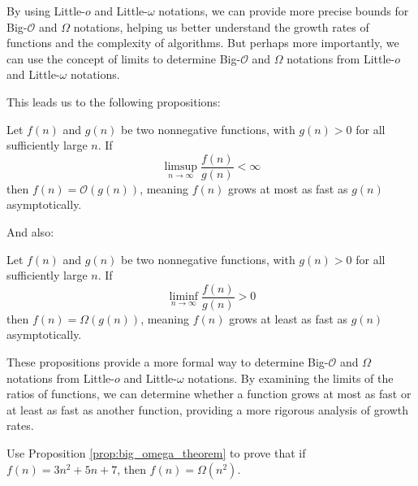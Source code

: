         By using Little-$o$ and Little-$\omega$ notations, we can provide more precise bounds for Big-$\mathcal{O}$ and $\Omega$ notations, helping us better understand the growth rates of functions and the complexity of algorithms. But perhaps more importantly, we can use the concept of limits to determine Big-$\mathcal{O}$ and $\Omega$ notations from Little-$o$ and Little-$\omega$ notations.

        This leads us to the following propositions:

        \begin{proposition} \label{prop:big_o_theorem}
            Let \( f(n) \) and \( g(n) \) be two nonnegative functions, with $g(n)>0$ for all sufficiently large $n$. If
            \medskip
            \[
            \limsup_{n \rightarrow \infty} \frac{f(n)}{g(n)} < \infty
            \]
            \medskip
            then \( f(n) = \mathcal{O}(g(n)) \), meaning \( f(n) \) grows at most as fast as \( g(n) \) asymptotically.
        \end{proposition}
        
        And also:


        \begin{proposition} \label{prop:big_omega_theorem}
            Let \( f(n) \) and \( g(n) \) be two nonnegative functions, with $g(n)>0$ for all sufficiently large $n$. If
            \medskip
            \[
            \liminf_{n \rightarrow \infty} \frac{f(n)}{g(n)} > 0
            \]
            \medskip
            then \( f(n) = \Omega(g(n)) \), meaning \( f(n) \) grows at least as fast as \( g(n) \) asymptotically.
        \end{proposition}
        
        These propositions provide a more formal way to determine Big-$\mathcal{O}$ and $\Omega$ notations from Little-$o$ and Little-$\omega$ notations. By examining the limits of the ratios of functions, we can determine whether a function grows at most as fast or at least as fast as another function, providing a more rigorous analysis of growth rates.
            
            \begin{example}
            Use Proposition \ref{prop:big_omega_theorem} to prove that if \( f(n) = 3n^2 + 5n + 7 \), then \( f(n) = \Omega(n^2) \).
            \end{example}
            
